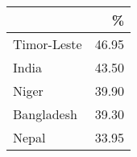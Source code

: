 \begin{table}[]
\centering
{\footnotesize
\begin{tabular}{lr}
  \toprule
 & \% \\ 
  \midrule
Timor-Leste & 46.95 \\ 
  India & 43.50 \\ 
  Niger & 39.90 \\ 
  Bangladesh & 39.30 \\ 
  Nepal & 33.95 \\ 
   \bottomrule
\end{tabular}
}
\end{table}

